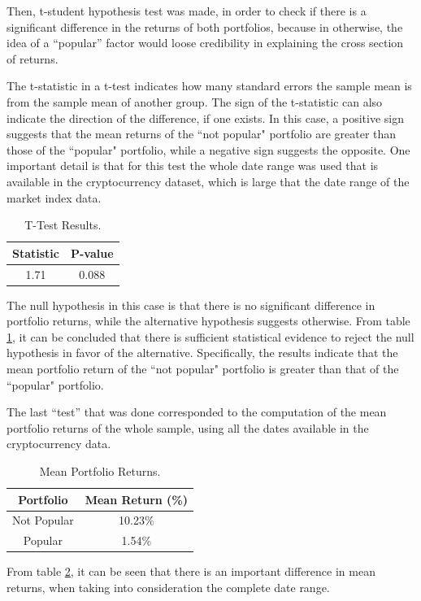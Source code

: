 Then, t-student hypothesis test was made, in order to check if there is a significant difference in the returns of both portfolios, because in otherwise, the idea of a ``popular'' factor would loose credibility in explaining the cross section of returns.

The t-statistic in a t-test indicates how many standard errors the sample mean is from the sample mean of another group. The sign of the t-statistic can also indicate the direction of the difference, if one exists. In this case, a positive sign suggests that the mean returns of the ``not popular" portfolio are greater than those of the ``popular" portfolio, while a negative sign suggests the opposite. One important detail is that for this test the whole date range was used that is available in the cryptocurrency dataset, which is large that the date range of the market index data.
\begin{table}[h!]
	\centering
	\captionsetup{skip=0.5\baselineskip}
	\caption{T-Test Results.}
	\begin{tabular}{|c|c|}
		\hline
		\textbf{Statistic} & \textbf{P-value} \\ \hline
		1.71 & 0.088 \\ \hline
	\end{tabular}
	\label{tab:ttest-results}
\end{table}

The null hypothesis in this case is that there is no significant difference in portfolio returns, while the alternative hypothesis suggests otherwise. From table \ref{tab:ttest-results}, it can be concluded that there is sufficient statistical evidence to reject the null hypothesis in favor of the alternative. Specifically, the results indicate that the mean portfolio return of the ``not popular" portfolio is greater than that of the ``popular" portfolio.

The last ``test'' that was done corresponded to the computation of the mean portfolio returns of the whole sample, using all the dates available in the cryptocurrency data.
\begin{table}[h!]
	\centering
	\captionsetup{skip=0.5\baselineskip}
	\caption{Mean Portfolio Returns.}
	\begin{tabular}{|c|c|}
		\hline
		\textbf{Portfolio} & \textbf{Mean Return (\%)} \\ \hline
		Not Popular & 10.23\% \\ \hline
		Popular & 1.54\% \\ \hline
	\end{tabular}
	\label{tab:mean-portfolio-returns}
\end{table}
From table \ref{tab:mean-portfolio-returns}, it can be seen that there is an important difference in mean returns, when taking into consideration the complete date range.

